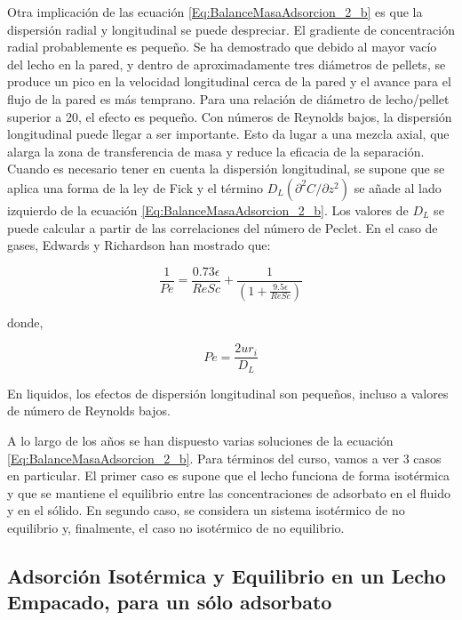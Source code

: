 \documentclass[11pt]{book}
\begin{document}
Otra implicación de las ecuación \ref{Eq:BalanceMasaAdsorcion_2_b} es que la dispersión radial y longitudinal se puede despreciar. El gradiente de concentración radial probablemente es pequeño. Se ha demostrado que debido al mayor vacío del lecho en la pared, y dentro de aproximadamente tres diámetros de pellets, se produce un pico en la velocidad longitudinal cerca de la pared y el avance para el flujo de la pared es más temprano. Para una relación de diámetro de lecho/pellet superior a 20, el efecto es pequeño. Con números de Reynolds bajos, la dispersión longitudinal puede llegar a ser importante. Esto da lugar a una mezcla axial, que alarga la zona de transferencia de masa y reduce la eficacia de la separación. Cuando es necesario tener en cuenta la dispersión longitudinal, se supone que se aplica una forma de la ley de Fick y el término $D_L (\partial^2 C/ \partial z^2)$ se añade al lado izquierdo de la ecuación \ref{Eq:BalanceMasaAdsorcion_2_b}. Los valores de $D_L$ se puede calcular a partir de las correlaciones del número de Peclet. En el caso de gases, Edwards y Richardson han mostrado que:

\begin{equation}
    \label{Eq:BalanceMasaAdsorcion_5}
    \frac{1}{Pe} = \frac{0.73 \epsilon}{Re Sc} + \frac{1}{\left( 1 + \frac{9.5 \epsilon}{Re Sc} \right)}
\end{equation}

donde,

\begin{equation*}
    Pe = \frac{2 u r_i}{D_L}
\end{equation*}

En liquidos, los efectos de dispersión longitudinal son pequeños, incluso a valores de número de Reynolds bajos.

A lo largo de los años se han dispuesto varias soluciones de la ecuación \ref{Eq:BalanceMasaAdsorcion_2_b}. Para términos del curso, vamos a ver 3 casos en particular. El primer caso es supone que el lecho funciona de forma isotérmica y que se mantiene el equilibrio entre las concentraciones de adsorbato en el fluido y en el sólido. En segundo caso, se considera un sistema isotérmico de no equilibrio y, finalmente, el caso no isotérmico de no equilibrio.

\subsection{Adsorción Isotérmica y Equilibrio en un Lecho Empacado, para un sólo adsorbato}
\end{document}

